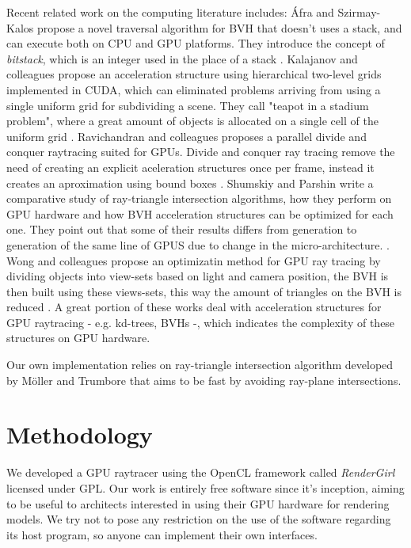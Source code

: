 \documentclass[a4paper]{sbgames}               %
\begin{document}
Recent related work on the computing literature includes: Áfra and
Szirmay-Kalos propose a novel traversal algorithm for BVH that doesn't
uses a stack, and can execute both on CPU and GPU platforms. They
introduce the concept of \emph{bitstack}, which is an integer used in
the place of a stack \cite{Afra}. Kalajanov and colleagues propose an
acceleration structure using hierarchical two-level grids implemented
in CUDA, which can eliminated problems arriving from using a single
uniform grid for subdividing a scene. They call "teapot in a stadium
problem", where a great amount of objects is allocated on a single
cell of the uniform grid \cite{Kalojanov}. Ravichandran and colleagues
proposes a parallel divide and conquer raytracing suited for
GPUs. Divide and conquer ray tracing remove the need of creating an
explicit aceleration structures once per frame, instead it creates an
aproximation using bound boxes \cite{Ravichandran}. Shumskiy and
Parshin write a comparative study of ray-triangle intersection
algorithms, how they perform on GPU hardware and how BVH acceleration
structures can be optimized for each one. They point out that some of
their results differs from generation to generation of the same line
of GPUS due to change in the micro-architecture.
\cite{Shumskiy}. Wong and colleagues propose an optimizatin method for
GPU ray tracing by dividing objects into view-sets based on light and
camera position, the BVH is then built using these views-sets, this
way the amount of triangles on the BVH is reduced \cite{Wong}. A great
portion of these works deal with acceleration structures for GPU
raytracing - e.g. kd-trees, BVHs -, which indicates the complexity of
these structures on GPU hardware.

Our own implementation relies on ray-triangle intersection algorithm
developed by Möller and Trumbore that aims to be fast by avoiding
ray-plane intersections\cite{moller}.

\section{Methodology}
\label{sec:methodology}

We developed a GPU raytracer using the OpenCL framework called
\emph{RenderGirl} licensed under GPL. Our work is entirely free
software since it's inception, aiming to be useful to architects
interested in using their GPU hardware for rendering models. We try not
to pose any restriction on the use of the software regarding its host
program, so anyone can implement their own interfaces.
\end{document}
